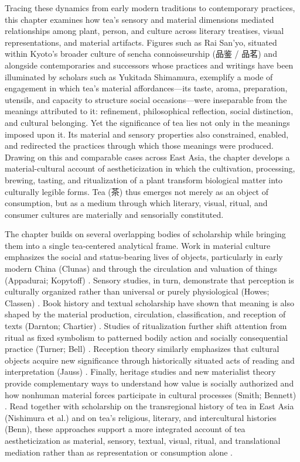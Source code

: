 \documentclass[numbers]{IntechOpen-Book}
\newcommand{\zh}[1]{{\CJKfontspec{Noto Serif CJK SC}\upshape #1}}
\begin{document}
Tracing these dynamics from early modern traditions to contemporary practices, this chapter examines how tea's sensory and material dimensions mediated relationships among plant, person, and culture across literary treatises, visual representations, and material artifacts. Figures such as Rai San'yo, situated within Kyoto's broader culture of sencha connoisseurship (\zh{品鉴 / 品茗}) and alongside contemporaries and successors whose practices and writings have been illuminated by scholars such as Yukitada Shimamura, exemplify a mode of engagement in which tea's material affordances---its taste, aroma, preparation, utensils, and capacity to structure social occasions---were inseparable from the meanings attributed to it: refinement, philosophical reflection, social distinction, and cultural belonging. Yet the significance of tea lies not only in the meanings imposed upon it. Its material and sensory properties also constrained, enabled, and redirected the practices through which those meanings were produced. Drawing on this and comparable cases across East Asia, the chapter develops a material-cultural account of aestheticization in which the cultivation, processing, brewing, tasting, and ritualization of a plant transform biological matter into culturally legible forms. Tea (\zh{茶}) thus emerges not merely as an object of consumption, but as a medium through which literary, visual, ritual, and consumer cultures are materially and sensorially constituted.

The chapter builds on several overlapping bodies of scholarship while bringing them into a single tea-centered analytical frame. Work in material culture emphasizes the social and status-bearing lives of objects, particularly in early modern China (Clunas) and through the circulation and valuation of things (Appadurai; Kopytoff) \cite{appadurai,kopytoff,clunas}. Sensory studies, in turn, demonstrate that perception is culturally organized rather than universal or purely physiological (Howes; Classen) \cite{howes,classen}. Book history and textual scholarship have shown that meaning is also shaped by the material production, circulation, classification, and reception of texts (Darnton; Chartier) \cite{darnton,chartier}. Studies of ritualization further shift attention from ritual as fixed symbolism to patterned bodily action and socially consequential practice (Turner; Bell) \cite{turner,bell}. Reception theory similarly emphasizes that cultural objects acquire new significance through historically situated acts of reading and interpretation (Jauss) \cite{jauss}. Finally, heritage studies and new materialist theory provide complementary ways to understand how value is socially authorized and how nonhuman material forces participate in cultural processes (Smith; Bennett) \cite{smithheritage,bennett}. Read together with scholarship on the transregional history of tea in East Asia (Nishimura et al.) and on tea's religious, literary, and intercultural histories (Benn), these approaches support a more integrated account of tea aestheticization as material, sensory, textual, visual, ritual, and translational mediation rather than as representation or consumption alone \cite{nishimura,benn}.
\end{document}

